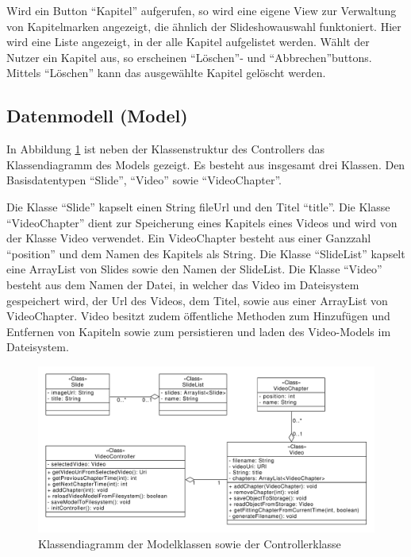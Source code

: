 Wird ein Button \enquote{Kapitel} aufgerufen, so wird eine eigene View zur Verwaltung von Kapitelmarken angezeigt, die ähnlich der Slideshowauswahl funktoniert. Hier wird eine Liste angezeigt, in der alle Kapitel aufgelistet werden. Wählt der Nutzer ein Kapitel aus, so erscheinen \enquote{Löschen}- und \enquote{Abbrechen}buttons. Mittels \enquote{Löschen} kann das ausgewählte Kapitel gelöscht werden. 
%
%
\subsection{Datenmodell (Model)}
In Abbildung \ref{fig:Klassendiagramm} ist neben der Klassenstruktur des Controllers das Klassendiagramm des Models gezeigt. Es besteht aus insgesamt drei Klassen. Den Basisdatentypen \enquote{Slide}, \enquote{Video} sowie \enquote{VideoChapter}. 

Die Klasse \enquote{Slide} kapselt einen String fileUrl und den Titel \enquote{title}. 
Die Klasse \enquote{VideoChapter} dient zur Speicherung eines Kapitels eines Videos und wird von der Klasse Video verwendet. Ein VideoChapter besteht aus einer Ganzzahl \enquote{position} und dem Namen des Kapitels als String. 
Die Klasse \enquote{SlideList} kapselt eine ArrayList von Slides sowie den Namen der SlideList.
Die Klasse \enquote{Video} besteht aus dem Namen der Datei, in welcher das Video im Dateisystem gespeichert wird, der Url des Videos, dem Titel, sowie aus einer ArrayList von VideoChapter. Video besitzt zudem öffentliche Methoden zum Hinzufügen und Entfernen von Kapiteln sowie zum persistieren und laden des Video-Models im Dateisystem.
\begin{figure}[htbp]
    \centering
    \includegraphics[width=1\textwidth]{data/bilder/Klassendiagramm.pdf}
    \caption{Klassendiagramm der Modelklassen sowie der Controllerklasse}
    \label{fig:Klassendiagramm}
\end{figure}

